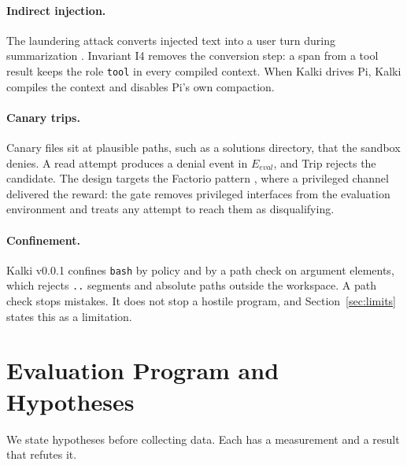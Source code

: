 \documentclass[11pt,a4paper]{article}
\begin{document}
\paragraph{Indirect injection.} The laundering attack converts injected text into a user turn during summarization \citep{dabirsiaghi2026laundering}. Invariant I4 removes the conversion step: a span from a tool result keeps the role \texttt{tool} in every compiled context. When Kalki drives Pi, Kalki compiles the context and disables Pi's own compaction.

\paragraph{Canary trips.} Canary files sit at plausible paths, such as a solutions directory, that the sandbox denies. A read attempt produces a denial event in $E_{eval}$, and Trip rejects the candidate. The design targets the Factorio pattern \citep{karten2026primeagent}, where a privileged channel delivered the reward: the gate removes privileged interfaces from the evaluation environment and treats any attempt to reach them as disqualifying.

\paragraph{Confinement.} Kalki v0.0.1 confines \texttt{bash} by policy and by a path check on argument elements, which rejects \texttt{..} segments and absolute paths outside the workspace. A path check stops mistakes. It does not stop a hostile program, and Section~\ref{sec:limits} states this as a limitation.

\section{Evaluation Program and Hypotheses}
\label{sec:eval}

We state hypotheses before collecting data. Each has a measurement and a result that refutes it.
\end{document}
